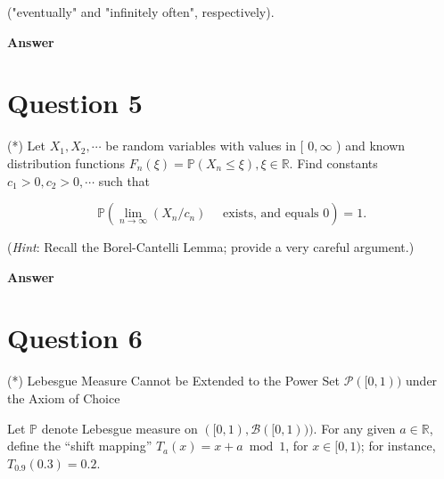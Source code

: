 \documentclass[letterpaper]{article}
\begin{document}
		("eventually" and "infinitely often", respectively).
		
		\textbf{Answer}
		
		\clearpage
		
		\section{Question 5}
		
		(*) Let $X_{1}, X_{2}, \cdots$ be random variables with values in [ $0, \infty$ ) and known distribution functions $F_{n}(\xi)=\mathbb{P}\left(X_{n} \leq \xi\right), \xi \in \mathbb{R}$. Find constants $c_{1}>0, c_{2}>0, \cdots$ such that
		
		$$
		\mathbb{P}\left(\lim _{n \rightarrow \infty}\left(X_{n} / c_{n}\right) \quad \text { exists, and equals } 0\right)=1 .
		$$
		
		(\emph{Hint}: Recall the Borel-Cantelli Lemma; provide a very careful argument.)
		
		\textbf{Answer}
		
		\clearpage
		
		\section{Question 6}
		
		{\color{deepred} (*) Lebesgue Measure Cannot be Extended to the Power Set $\mathcal{P}([0,1))$ under the Axiom of Choice}
		
		Let $\mathbb{P}$ denote Lebesgue measure on $([0,1), \mathcal{B}([0,1)))$. For any given $a \in \mathbb{R}$, define the ``shift mapping'' $T_a(x) = x + a \bmod 1$, for $x \in [0,1)$; for instance, $T_{0.9}(0.3) = 0.2$.
		
\end{document}
